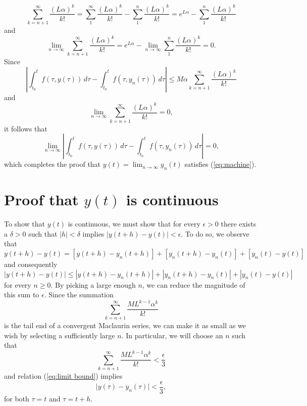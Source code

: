 \documentclass{myart}
\newcommand{\eq}[1]{(\ref{eq:#1})}
\begin{document}
\begin{equation*}
\sum_{k=n+1}^\infty \frac{(L\alpha)^k}{k!} = \sum_1^\infty \frac{(L\alpha)^k}{k!} - \sum_1^n \frac{(L\alpha)^k}{k!} = e^{L\alpha} - \sum_1^n \frac{(L\alpha)^k}{k!}
\end{equation*}
and
\begin{equation*}
\lim_{n \to \infty} \sum_{k=n+1}^\infty \frac{(L\alpha)^k}{k!} = e^{L\alpha} - \lim_{n \to \infty} \sum_1^n \frac{(L\alpha)^k}{k!} = 0.
\end{equation*}
Since
\begin{equation*}
\left|\int_{t_0}^t f(\tau, y(\tau)) \,d\tau - \int_{t_0}^t f(\tau, y_n(\tau)) \,d\tau\right| \leq M\alpha \sum_{k=n+1}^\infty \frac{(L\alpha)^k}{k!}
\end{equation*}
and
\begin{equation*}
\lim_{n \to \infty} \sum_{k=n+1}^\infty \frac{(L\alpha)^k}{k!} = 0,
\end{equation*}
it follows that
\begin{equation*}
\lim_{n \to \infty} \left|\int_{t_0}^t f(\tau, y(\tau)) \,d\tau - \int_{t_0}^t f(\tau, y_n(\tau)) \,d\tau\right| = 0,
\end{equation*}
which completes the proof that $y(t) = \lim_{n \to \infty} y_n(t)$ satisfies \eq{machine}.

\section{Proof that \texorpdfstring{$y(t)$}{y(t)} is continuous}

To show that $y(t)$ is continuous, we must show that for every $\epsilon > 0$ there exists a $\delta > 0$ such that $|h| < \delta$ implies $|y(t + h) - y(t)| < \epsilon$. To do so, we observe that
\begin{equation*}
y(t + h) - y(t) = [y(t + h) - y_n(t + h)] + [y_n(t + h) - y_n(t)] + [y_n(t) - y(t)]
\end{equation*}
and consequently
\begin{equation*}
|y(t + h) - y(t)| \leq |y(t + h) - y_n(t + h)| + |y_n(t + h) - y_n(t)| + |y_n(t) - y(t)|
\end{equation*}
for every $n \geq 0$. By picking a large enough $n$, we can reduce the magnitude of this sum to $\epsilon$. Since the summation
\begin{equation*}
\sum_{k=n+1}^\infty \frac{ML^{k-1}\alpha^k}{k!}
\end{equation*}
is the tail end of a convergent Maclaurin series, we can make it as small as we wish by selecting a sufficiently large $n$. In particular, we will choose an $n$ such that
\begin{equation*}
\sum_{k=n+1}^\infty \frac{ML^{k-1}\alpha^k}{k!} < \frac{\epsilon}{3}
\end{equation*}
and relation \eq{limit bound} implies
\begin{equation*}
\Big|y(\tau) - y_n(\tau)\Big| < \frac{\epsilon}{3},
\end{equation*}
for both $\tau = t$ and $\tau = t + h$.
\end{document}
